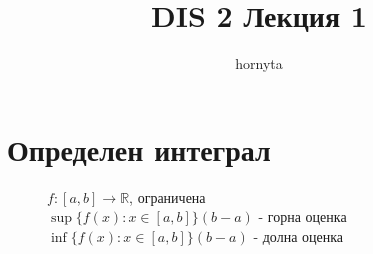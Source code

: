 \documentclass{article}
\author{hornyta}
\title{DIS 2 Лекция 1}
\begin{document}
\maketitle

\section{Определен интеграл}
\begin{figure}[h!]
    
    

    \(f:[a,b] \to \mathbb{R} \), ограничена \\
    \(\sup\{ f(x) : x \in [a, b] \} (b-a)\) - горна оценка \\
    \(\inf\{ f(x) : x \in [a, b] \} (b-a)\) - долна оценка
    
\end{figure}
\end{document}
